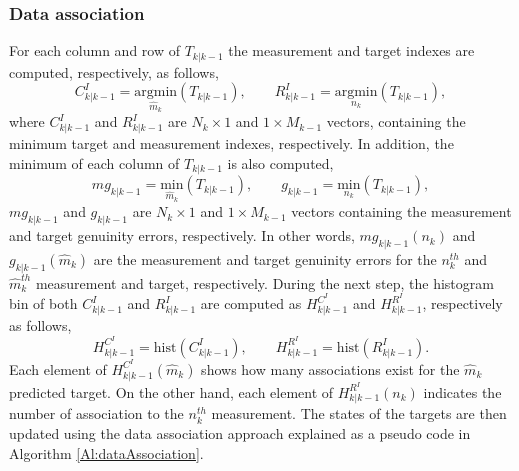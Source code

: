 \documentclass[runningheads]{llncs}
\begin{document}
\subsubsection{Data association}
For each column and row of $T_{k|k-1}$ the measurement and target indexes are computed, respectively, as follows,
\begin{equation}
C^{I}_{k|k-1} = \underset{\hat{m}_k}{\mathrm{argmin}} \left(T_{k|k-1}\right), \qquad
R^{I}_{k|k-1} = \underset{n_k}{\mathrm{argmin}} \left(T_{k|k-1}\right),
\end{equation}
\noindent where $C^{I}_{k|k-1}$ and $R^{I}_{k|k-1}$ are $N_k \times 1$ and $1 \times M_{k-1}$ vectors, containing the minimum target and measurement indexes, respectively. In addition, the minimum of each column of $T_{k|k-1}$ is also computed,
\begin{equation}
mg_{k|k-1} = \underset{\hat{m}_k}{\mathrm{min}} \left(T_{k|k-1}\right), \qquad
g_{k|k-1} = \underset{n_k}{\mathrm{min}} \left(T_{k|k-1}\right),
\end{equation} 
 $mg_{k|k-1}$ and $g_{k|k-1}$ are $N_k \times 1$ and $1 \times M_{k-1}$ vectors containing the measurement and target genuinity errors, respectively. In other words, $mg_{k|k-1}(n_k)$ and $g_{k|k-1}\left(\hat{m}_k\right)$ are the measurement and target genuinity errors for the $n_k^{th}$ and $\hat{m}_k^{th}$ measurement and target, respectively.
During the next step, the histogram bin of both $C^{I}_{k|k-1}$ and $R^{I}_{k|k-1}$ are computed as $H^{C^{I}}_{k|k-1}$ and $H^{R^{I}}_{k|k-1}$, respectively as follows,
\begin{equation}
H^{C^{I}}_{k|k-1} = \mathrm{hist}(C^{I}_{k|k-1}), \qquad
H^{R^{I}}_{k|k-1} = \mathrm{hist}(R^{I}_{k|k-1}).
\end{equation}
\noindent Each element of $H^{C^{I}}_{k|k-1}\left(\hat{m}_k\right)$ shows how many associations exist for the $\hat{m}_k$ predicted target. On the other hand, each element of $H^{R^{I}}_{k|k-1}\left(n_k\right)$ indicates the number of association to the $n_k^{th}$ measurement. The states of the targets are then updated using the data association approach explained as a pseudo code in Algorithm \ref{Al:dataAssociation}.
\end{document}
